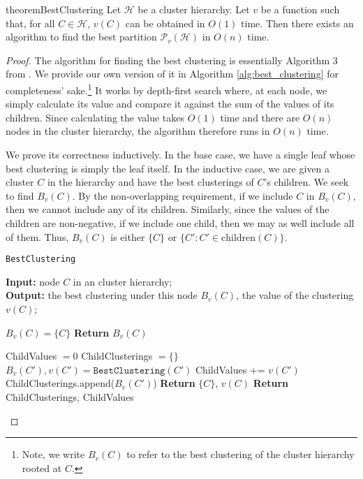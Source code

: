 \begin{restatable}{theorem}{BestClustering}
    \label{thm:best_clustering}
    Let $\mathcal{H}$ be a cluster hierarchy. Let $v$ be a function such that, for all $C \in \mathcal{H}$, $v(C)$ can be obtained in $O(1)$ time. Then there exists an algorithm to find the best partition $\mathcal{P}_v(\mathcal{H})$ in $O(n)$ time.
\end{restatable}
\begin{proof}
    The algorithm for finding the best clustering is essentially Algorithm 3 from \citet{hdbscan}. We provide our own version of it in Algorithm \ref{alg:best_clustering} for completeness' sake.\footnote{Note, we write $B_v(C)$ to refer to the best clustering of the cluster hierarchy rooted at $C$.} It works by depth-first search where, at each node, we simply calculate its value and compare it against the sum of the values of its children. Since calculating the value takes $O(1)$ time and there are $O(n)$ nodes in the cluster hierarchy, the algorithm therefore runs in $O(n)$ time.

    We prove its correctness inductively. In the base case, we have a single leaf whose best clustering is simply the leaf itself. In the inductive case, we are given a cluster $C$ in the hierarchy and have the best clusterings of $C$'s children. We seek to find $B_v(C)$. By the non-overlapping requirement, if we include $C$ in $B_v(C)$, then we cannot include any of its children. Similarly, since the values of the children are non-negative, if we include one child, then we may as well include all of them. Thus, $B_v(C)$ is either $\{C\}$ or $\{C' : C' \in \text{children}(C)\}$.

    \begin{algorithm}
    \caption{\texttt{BestClustering}}\label{alg:best_clustering}
    \textbf{Input:} node $C$ in an cluster hierarchy;\\
    \textbf{Output:} the best clustering under this node $B_v(C)$, the value of the clustering $v(C)$;
    \begin{algorithmic}[1]
            \State $B_v(C) = \{C\}$
            \State \textbf{Return} $B_v(C)$
        \EndIf \vspace*{0.2cm}

        \State ChildValues $= 0$
        \State ChildClusterings $= \{ \}$
            \State $B_v(C'), v(C') = \texttt{BestClustering}(C')$
            \State ChildValues += $v(C')$
            \State ChildClusterings.append($B_v(C')$)
        \EndFor
            \State \textbf{Return} $\{C\}$, $v(C)$
        \EndIf
        \State \textbf{Return} ChildClusterings, ChildValues
    \end{algorithmic}
    \end{algorithm}

\end{proof}

